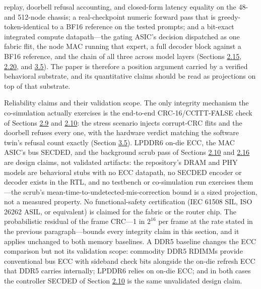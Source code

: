 \documentclass[10pt,twocolumn]{article}
\begin{document}
replay, doorbell refusal accounting, and closed-form latency equality on the 48- and 512-node chassis; a real-checkpoint numeric forward pass that is greedy-token-identical to a BF16 reference on the tested prompts; and a bit-exact integrated compute datapath---the gating ASIC's decision dispatched as one fabric flit, the node MAC running that expert, a full decoder block against a BF16 reference, and the chain of all three across model layers (Sections \hyperref[sec:2.15]{2.15}, \hyperref[sec:2.20]{2.20}, and \hyperref[sec:3.5]{3.5}). The paper is therefore a position argument carried by a verified behavioral substrate, and its quantitative claims should be read as projections on top of that substrate.

Reliability claims and their validation scope. The only integrity mechanism the co-simulation actually exercises is the end-to-end CRC-16/CCITT-FALSE check of Sections \hyperref[sec:2.9]{2.9} and \hyperref[sec:2.10]{2.10}: the stress scenario injects corrupt-CRC flits and the doorbell refuses every one, with the hardware verdict matching the software twin's refusal count exactly (Section \hyperref[sec:3.5]{3.5}). LPDDR6 on-die ECC, the MAC ASIC's bus SECDED, and the background scrub pass of Sections \hyperref[sec:2.10]{2.10} and \hyperref[sec:2.16]{2.16} are design claims, not validated artifacts: the repository's DRAM and PHY models are behavioral stubs with no ECC datapath, no SECDED encoder or decoder exists in the RTL, and no testbench or co-simulation run exercises them---the scrub's mean-time-to-undetected-mis-correction bound is a sized projection, not a measured property. No functional-safety certification (IEC 61508 SIL, ISO 26262 ASIL, or equivalent) is claimed for the fabric or the router chip. The probabilistic residual of the frame CRC---1 in $2^{16}$ per frame at the rate stated in the previous paragraph---bounds every integrity claim in this section, and it applies unchanged to both memory baselines. A DDR5 baseline changes the ECC comparison but not its validation scope: commodity DDR5 RDIMMs provide conventional bus ECC with sideband check bits alongside the on-die refresh ECC that DDR5 carries internally; LPDDR6 relies on on-die ECC; and in both cases the controller SECDED of Section \hyperref[sec:2.10]{2.10} is the same unvalidated design claim.
\end{document}
